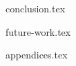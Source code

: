 \documentclass[a4paper,11pt,twoside]{report}
\begin{document}




{conclusion.tex}




{future-work.tex}



\clearpage





{appendices.tex}
\end{document}
